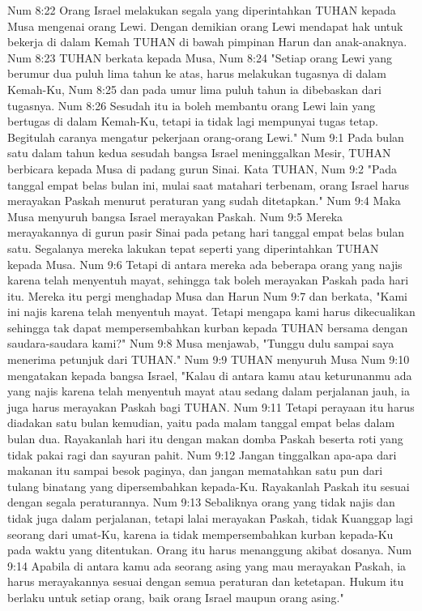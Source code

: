 Num 8:22  Orang Israel melakukan segala yang diperintahkan TUHAN kepada Musa mengenai orang Lewi. Dengan demikian orang Lewi mendapat hak untuk bekerja di dalam Kemah TUHAN di bawah pimpinan Harun dan anak-anaknya.
Num 8:23  TUHAN berkata kepada Musa,
Num 8:24  "Setiap orang Lewi yang berumur dua puluh lima tahun ke atas, harus melakukan tugasnya di dalam Kemah-Ku,
Num 8:25  dan pada umur lima puluh tahun ia dibebaskan dari tugasnya.
Num 8:26  Sesudah itu ia boleh membantu orang Lewi lain yang bertugas di dalam Kemah-Ku, tetapi ia tidak lagi mempunyai tugas tetap. Begitulah caranya mengatur pekerjaan orang-orang Lewi."
Num 9:1  Pada bulan satu dalam tahun kedua sesudah bangsa Israel meninggalkan Mesir, TUHAN berbicara kepada Musa di padang gurun Sinai. Kata TUHAN,
Num 9:2  "Pada tanggal empat belas bulan ini, mulai saat matahari terbenam, orang Israel harus merayakan Paskah menurut peraturan yang sudah ditetapkan."
Num 9:4  Maka Musa menyuruh bangsa Israel merayakan Paskah.
Num 9:5  Mereka merayakannya di gurun pasir Sinai pada petang hari tanggal empat belas bulan satu. Segalanya mereka lakukan tepat seperti yang diperintahkan TUHAN kepada Musa.
Num 9:6  Tetapi di antara mereka ada beberapa orang yang najis karena telah menyentuh mayat, sehingga tak boleh merayakan Paskah pada hari itu. Mereka itu pergi menghadap Musa dan Harun
Num 9:7  dan berkata, "Kami ini najis karena telah menyentuh mayat. Tetapi mengapa kami harus dikecualikan sehingga tak dapat mempersembahkan kurban kepada TUHAN bersama dengan saudara-saudara kami?"
Num 9:8  Musa menjawab, "Tunggu dulu sampai saya menerima petunjuk dari TUHAN."
Num 9:9  TUHAN menyuruh Musa
Num 9:10  mengatakan kepada bangsa Israel, "Kalau di antara kamu atau keturunanmu ada yang najis karena telah menyentuh mayat atau sedang dalam perjalanan jauh, ia juga harus merayakan Paskah bagi TUHAN.
Num 9:11  Tetapi perayaan itu harus diadakan satu bulan kemudian, yaitu pada malam tanggal empat belas dalam bulan dua. Rayakanlah hari itu dengan makan domba Paskah beserta roti yang tidak pakai ragi dan sayuran pahit.
Num 9:12  Jangan tinggalkan apa-apa dari makanan itu sampai besok paginya, dan jangan mematahkan satu pun dari tulang binatang yang dipersembahkan kepada-Ku. Rayakanlah Paskah itu sesuai dengan segala peraturannya.
Num 9:13  Sebaliknya orang yang tidak najis dan tidak juga dalam perjalanan, tetapi lalai merayakan Paskah, tidak Kuanggap lagi seorang dari umat-Ku, karena ia tidak mempersembahkan kurban kepada-Ku pada waktu yang ditentukan. Orang itu harus menanggung akibat dosanya.
Num 9:14  Apabila di antara kamu ada seorang asing yang mau merayakan Paskah, ia harus merayakannya sesuai dengan semua peraturan dan ketetapan. Hukum itu berlaku untuk setiap orang, baik orang Israel maupun orang asing."
